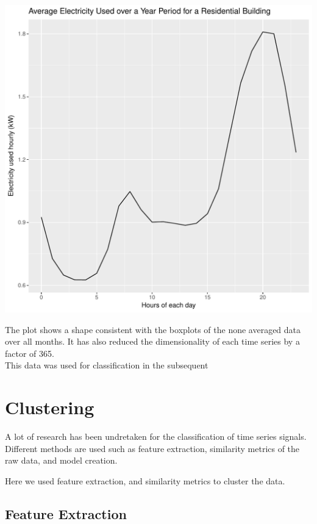 \documentclass[12pt]{article}\usepackage[]{graphicx}\usepackage[]{color}
\makeatletter
\def\maxwidth{ %
  \ifdim\Gin@nat@width>\linewidth
    \linewidth
  \else
    \Gin@nat@width
  \fi
}
\newenvironment{knitrout}{}{} %
\makeatother
\begin{document}
\begin{knitrout}
\color{fgcolor}
\includegraphics[width=\maxwidth]{figure/average-1} 

\end{knitrout}

The plot shows a shape consistent with the boxplots of the none averaged data over all months. It has also reduced the dimensionality of each time series by a factor of 365.\\

This data was used for classification in the subsequent 


\section{Clustering}

A lot of research has been undretaken for the classification of time series signals. Different methods are used such as feature extraction, similarity metrics of the raw data\cite{Wiens2009}, and model creation. \cite{WarrenLiao2005}

Here we used feature extraction, and similarity metrics to cluster the data. 



\subsection{Feature Extraction}
\end{document}
